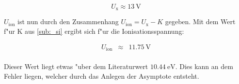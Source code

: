 \begin{equation}
	U_\mathrm{x} \approx \SI{13}{\volt}
\end{equation}

$U_\mathrm{ion}$ ist nun durch den Zusammenhang $U_\mathrm{ion} = U_\mathrm{x} - K$ gegeben.
Mit dem Wert f"ur K aus \ref{sub:_si} ergibt sich f"ur die Ionisationsspannung:

\begin{eqnarray*}
	U_\mathrm{ion} &\approx& \SI{11.75}{\volt} \\
\end{eqnarray*}


Dieser Wert liegt etwas "uber dem Literaturwert $\SI{10.44}{\electronvolt}$.
Dies kann an dem Fehler liegen, welcher durch das Anlegen der Asymptote entsteht.